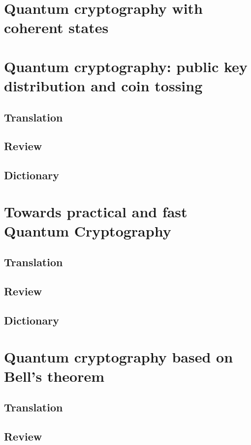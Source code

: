 

\newcommand{\trnas}{Translation}
\newcommand{\dic}{Dictionary}
\newcommand{\review}{Review}




\tableofcontents
\clearpage
\section{Quantum cryptography with coherent states}

%
\section{Quantum cryptography: public key distribution and coin tossing}
\blindtext
\subsection*{\trnas}
\blindtext
\subsection*{\review}
\blindtext
\subsection*{\dic}
\blindtext
\section{Towards practical and fast Quantum Cryptography}
\blindtext
\subsection*{\trnas}
\blindtext
\subsection*{\review}
\blindtext
\subsection*{\dic}
\blindtext
\section{Quantum cryptography based on Bell's theorem}
\blindtext
\subsection*{\trnas}
\blindtext
\subsection*{\review}
\blindtext
